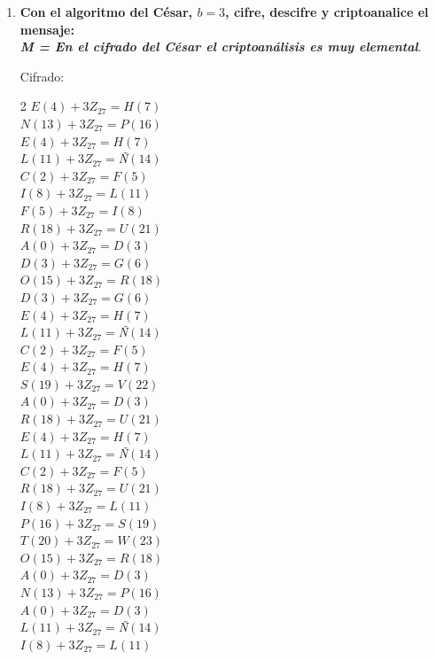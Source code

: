 \documentclass{article}
\begin{document}
\begin{enumerate}

    \item \textbf{Con el algoritmo del César, $b = 3$, cifre, descifre y criptoanalice el mensaje:   \\ \emph{M = En el cifrado del César el criptoanálisis es muy elemental}}.
    
    Cifrado: 
 \begin{multicols}{2} 
 $E(4)+3 Z_{27}=H (7)$\\
 $N(13)+3 Z_{27}=P (16)$\\
 $E(4)+3 Z_{27}=H (7)$\\
 $L(11)+3 Z_{27}= $\textit{Ñ}$ (14)$\\
 $C(2)+3 Z_{27}=F (5)$\\
 $I(8)+3 Z_{27}=L (11)$\\
 $F(5)+3 Z_{27}=I (8)$\\
 $R(18)+3 Z_{27}=U (21)$\\
 $A(0)+3 Z_{27}=D (3)$\\
 $D(3)+3 Z_{27}=G (6)$\\
 $O(15)+3 Z_{27}=R (18)$\\
 $D(3)+3 Z_{27}=G (6)$\\
 $E(4)+3 Z_{27}=H (7)$\\
 $L(11)+3 Z_{27}= $\textit{Ñ}$ (14)$\\
 $C(2)+3 Z_{27}=F (5)$\\
 $E(4)+3 Z_{27}=H (7)$\\
 $S(19)+3 Z_{27}=V (22)$\\
 $A(0)+3 Z_{27}=D (3)$\\
 $R(18)+3 Z_{27}=U (21)$\\ 
 $E(4)+3 Z_{27}=H (7)$\\
 $L(11)+3 Z_{27}= $\textit{Ñ}$ (14)$\\
 $C(2)+3 Z_{27}=F (5)$\\
 $R(18)+3 Z_{27}=U (21)$\\
 $I(8)+3 Z_{27}=L (11)$\\
 $P(16)+3 Z_{27}=S (19)$\\
 $T(20)+3 Z_{27}=W (23)$\\
 $O(15)+3 Z_{27}=R (18)$\\
 $A(0)+3 Z_{27}=D (3)$\\
 $N(13)+3 Z_{27}=P (16)$\\ 
 $A(0)+3 Z_{27}=D (3)$\\
 $L(11)+3 Z_{27}= $\textit{Ñ}$ (14)$\\
 $I(8)+3 Z_{27}=L (11)$\\

\end{multicols}
\end{enumerate}
\end{document}
